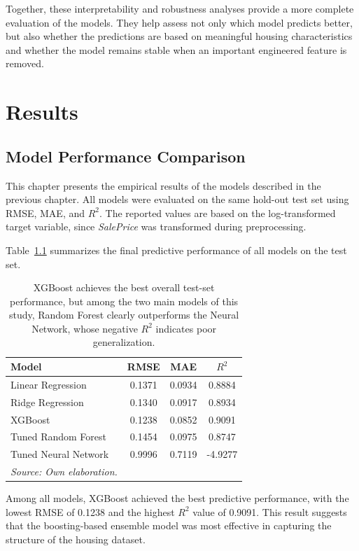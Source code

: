 \documentclass[12pt,a4paper,oneside,openany]{book}
\begin{document}
Together, these interpretability and robustness analyses provide a more complete evaluation of the models. They help assess not only which model predicts better, but also whether the predictions are based on meaningful housing characteristics and whether the model remains stable when an important engineered feature is removed.


\chapter{Results}


\section{Model Performance Comparison}

This chapter presents the empirical results of the models described in the previous chapter. All models were evaluated on the same hold-out test set using RMSE, MAE, and $R^2$. The reported values are based on the log-transformed target variable, since \textit{SalePrice} was transformed during preprocessing.

Table~\ref{tab:model_comparison} summarizes the final predictive performance of all models on the test set.

\begin{table}[H]
\centering
\caption{XGBoost achieves the best overall test-set performance, but among the two main models of this study, Random Forest clearly outperforms the Neural Network, whose negative $R^2$ indicates poor generalization.}
\label{tab:model_comparison}
\begin{tabular}{lccc}
\toprule
Model & RMSE & MAE & $R^2$ \\
\midrule
Linear Regression & 0.1371 & 0.0934 & 0.8884 \\
Ridge Regression & 0.1340 & 0.0917 & 0.8934 \\
XGBoost & 0.1238 & 0.0852 & 0.9091 \\
Tuned Random Forest & 0.1454 & 0.0975 & 0.8747 \\
Tuned Neural Network & 0.9996 & 0.7119 & -4.9277 \\
\bottomrule
\textit{Source: Own elaboration.}
\end{tabular}
\end{table}

Among all models, XGBoost achieved the best predictive performance, with the lowest RMSE of 0.1238 and the highest $R^2$ value of 0.9091. This result suggests that the boosting-based ensemble model was most effective in capturing the structure of the housing dataset.
\end{document}
